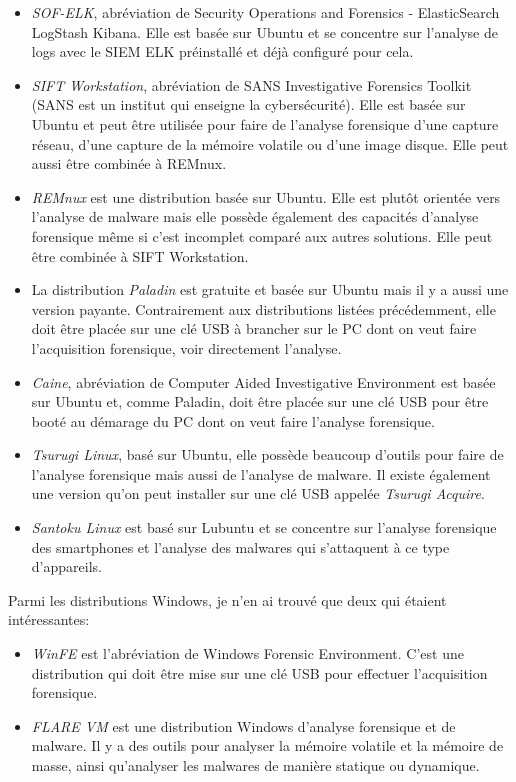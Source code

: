 \begin{itemize}
    \item \textit{SOF-ELK}, abréviation de Security Operations and Forensics - ElasticSearch LogStash Kibana. Elle est basée sur Ubuntu et se concentre sur l'analyse de logs avec le SIEM ELK préinstallé et déjà configuré pour cela.
    \item \textit{SIFT Workstation}, abréviation de SANS Investigative Forensics Toolkit (SANS est un institut qui enseigne la cybersécurité). Elle est basée sur Ubuntu et peut être utilisée pour faire de l'analyse forensique d'une capture réseau, d'une capture de la mémoire volatile ou d'une image disque. Elle peut aussi être combinée à REMnux.
    \item \textit{REMnux} est une distribution basée sur Ubuntu. Elle est plutôt orientée vers l'analyse de malware mais elle possède également des capacités d'analyse forensique même si c'est incomplet comparé aux autres solutions. Elle peut être combinée à SIFT Workstation.
    \item La distribution \textit{Paladin} est gratuite et basée sur Ubuntu mais il y a aussi une version payante. Contrairement aux distributions listées précédemment, elle doit être placée sur une clé USB à brancher sur le PC dont on veut faire l'acquisition forensique, voir directement l'analyse.
    \item \textit{Caine}, abréviation de Computer Aided Investigative Environment est basée sur Ubuntu et, comme Paladin, doit être placée sur une clé USB pour être booté au démarage du PC dont on veut faire l'analyse forensique.
    \item \textit{Tsurugi Linux}, basé sur Ubuntu, elle possède beaucoup d'outils pour faire de l'analyse forensique mais aussi de l'analyse de malware. Il existe également une version qu'on peut installer sur une clé USB appelée \textit{Tsurugi Acquire}.
    \item \textit{Santoku Linux} est basé sur Lubuntu et se concentre sur l'analyse forensique des smartphones et l'analyse des malwares qui s'attaquent à ce type d'appareils.
\end{itemize}

Parmi les distributions Windows, je n'en ai trouvé que deux qui étaient intéressantes:

\begin{itemize}
    \item \textit{WinFE} est l'abréviation de Windows Forensic Environment. C'est une distribution qui doit être mise sur une clé USB pour effectuer l'acquisition forensique.
    \item \textit{FLARE VM} est une distribution Windows d'analyse forensique et de malware. Il y a des outils pour analyser la mémoire volatile et la mémoire de masse, ainsi qu'analyser les malwares de manière statique ou dynamique.
\end{itemize}

